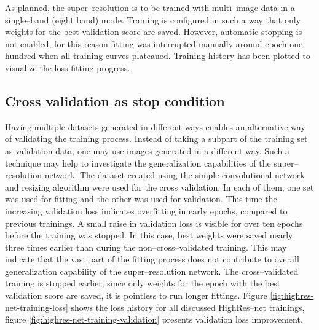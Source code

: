 As planned, the super--resolution is to be trained with multi--image data in a single--band (eight band) mode.
Training is configured in such a way that only weights for the best validation score are saved.
However, automatic stopping is not enabled, for this reason fitting was interrupted manually around epoch one hundred when all training curves plateaued.
Training history has been plotted to visualize the loss fitting progress.

\subsection{Cross validation as stop condition}
Having multiple datasets generated in different ways enables an alternative way of validating the training process.
Instead of taking a subpart of the training set as validation data, one may use images generated in a different way.
Such a technique may help to investigate the generalization capabilities of the super--resolution network.
The dataset created using the simple convolutional network and resizing algorithm were used for the cross validation.
In each of them, one set was used for fitting and the other was used for validation.
This time the increasing validation loss indicates overfitting in early epochs, compared to previous trainings.
A small raise in validation loss is visible for over ten epochs before the training was stopped.
In this case, best weights were saved nearly three times earlier than during the non--cross--validated training. 
This may indicate that the vast part of the fitting process does not contribute to overall generalization capability of the super--resolution network.
The cross--validated training is stopped earlier; since only weights for the epoch with the best validation score are saved, it is pointless to run longer fittings.
Figure \ref{fig:highres-net-training-loss} shows the loss history for all discussed HighRes--net trainings, figure \ref{fig:highres-net-training-validation} presents validation loss improvement.

